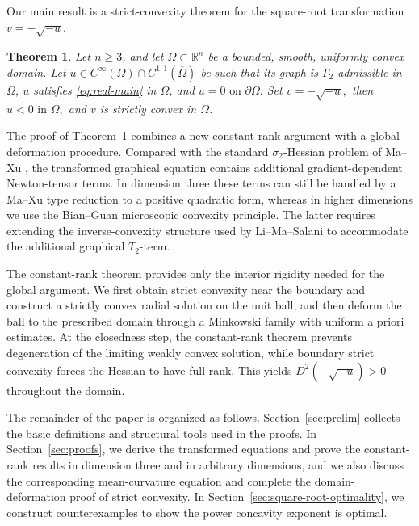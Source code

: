 \documentclass{article}
\newtheorem{theorem}{Theorem}[section]
\numberwithin{equation}{section}
\begin{document}
Our main result is a strict-convexity theorem for the square-root transformation \(v=-\sqrt{-u}\).
\begin{theorem}\label{thm:real-strict-convexity}
Let \(n\ge 3\), and let \(\Omega\subset\mathbb R^n\) be a bounded,
smooth, uniformly convex domain. Let
$u\in C^\infty(\Omega)\cap C^{1,1}(\overline{\Omega})$
be such that its graph is \(\Gamma_2\)-admissible in \(\Omega\),
\(u\) satisfies \eqref{eq:real-main} in \(\Omega\), and
$u=0\,\,\text{on }\partial\Omega.$
Set   
$v=-\sqrt{-u},$
then
$u<0\,\,\text{in }\Omega,$
and \(v\) is strictly convex in \(\Omega\).
\end{theorem}

The proof of Theorem~\ref{thm:real-strict-convexity} combines a new
constant-rank argument with a global deformation procedure. Compared
with the standard $\sigma_2$-Hessian problem of Ma--Xu \cite{MX08},
the transformed graphical equation contains additional
gradient-dependent Newton-tensor terms. In dimension three these terms can still be handled by a Ma--Xu type reduction to a positive quadratic form, whereas in higher dimensions we use the Bian--Guan microscopic convexity principle. The latter requires extending the inverse-convexity structure used by Li--Ma--Salani \cite{LMS26} to accommodate the additional graphical $T_2$-term.

The constant-rank theorem provides only the interior rigidity needed
for the global argument. We first obtain strict convexity near the
boundary and construct a strictly convex radial solution on the unit
ball, and then deform the ball to the prescribed domain through a
Minkowski family with uniform a priori estimates. At the closedness
step, the constant-rank theorem prevents degeneration of the limiting weakly convex solution, while boundary strict convexity forces the Hessian to have full rank. This yields
$D^2(-\sqrt{-u})>0$ throughout the domain.

The remainder of the paper is organized as follows. Section~\ref{sec:prelim} collects the basic definitions and structural tools used in the proofs. In Section~\ref{sec:proofs}, we derive the transformed equations and prove the constant-rank results in dimension three and in arbitrary dimensions, and we also discuss the corresponding mean-curvature equation and complete the domain-deformation proof of strict convexity. In Section~\ref{sec:square-root-optimality}, we construct counterexamples to show the power concavity exponent is optimal.
\end{document}
